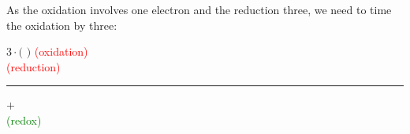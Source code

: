 \documentclass[main.tex]{subfiles}
\begin{document}
\begin{description}
\begin{center}\end{center}
As the oxidation involves one electron and the reduction three, we need to time the oxidation by three:
 \begin{center}
$3\cdot \big($  $\big)$ \hspace*{0pt}\hfill  \textcolor{red}{ (oxidation) }\\
   \hspace*{0pt}\hfill  \textcolor{red}{ (reduction) } \\
\rule{12cm}{0.4pt}$+$\\
{\raggedleft {} \hspace*{0pt}\hfill  \textcolor{green}{ (redox) } }  \\ 
\hspace*{\fill}
 \end{center}


\end{description}
\end{document}

